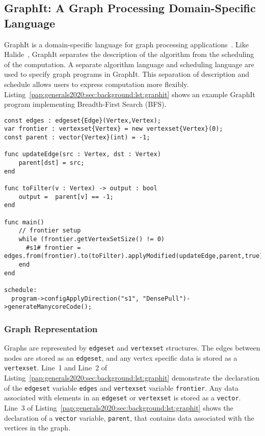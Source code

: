 
\subsection{GraphIt: A Graph Processing Domain-Specific Language}\label{pap:generals2020:sec:graphit}

GraphIt is a domain-specific language for graph processing applications~\citep{zhang2018graphit}.
Like Halide~\citep{ragan2013halide}, GraphIt separates the description of the algorithm from the scheduling of the computation. A separate algorithm language and scheduling language are used to specify graph programs in GraphIt. This separation of description and schedule allows users to express computation more flexibly.
Listing~\ref{pap:generals2020:sec:background:lst:graphit} shows an example GraphIt program implementing Breadth-First Search (BFS).

\begin{lstlisting}[language=graphit, 
                   caption=GraphIt code for Breadth-First Search (BFS),
                   label=pap:generals2020:sec:background:lst:graphit]
const edges : edgeset{Edge}(Vertex,Vertex);
var frontier : vertexset{Vertex} = new vertexset{Vertex}(0);
const parent : vector{Vertex}(int) = -1;

func updateEdge(src : Vertex, dst : Vertex)
    parent[dst] = src;
end

func toFilter(v : Vertex) -> output : bool
    output =  parent[v] == -1;
end

func main()
    // frontier setup
    while (frontier.getVertexSetSize() != 0)
      #s1# frontier = edges.from(frontier).to(toFilter).applyModified(updateEdge,parent,true);
    end
end

schedule:
  program->configApplyDirection("s1", "DensePull")->generateManycoreCode();
\end{lstlisting}

\subsubsection{Graph Representation}
Graphs are represented by \lstinline[language=graphit]{edgeset} and \lstinline[language=graphit]{vertexset} structures.
The edges between nodes are stored as an \lstinline[language=graphit]{edgeset}, and any vertex specific data is stored as a \lstinline[language=graphit]{vertexset}.
Line~1 and Line~2 of Listing~\ref{pap:generals2020:sec:background:lst:graphit} demonstrate the declaration of the \lstinline[language=graphit]{edgeset} variable \lstinline[language=graphit]{edges} and  \lstinline[language=graphit]{vertexset} variable \lstinline[language=graphit]{frontier}. 
Any data associated with elements in an \lstinline[language=graphit]{edgeset} or \lstinline[language=graphit]{vertexset} is stored as a \lstinline[language=graphit]{vector}.
Line~3 of Listing~\ref{pap:generals2020:sec:background:lst:graphit} shows the declaration of a \lstinline[language=graphit]{vector} variable, \lstinline[language=graphit]{parent}, that contains data associated with the vertices in the graph.

